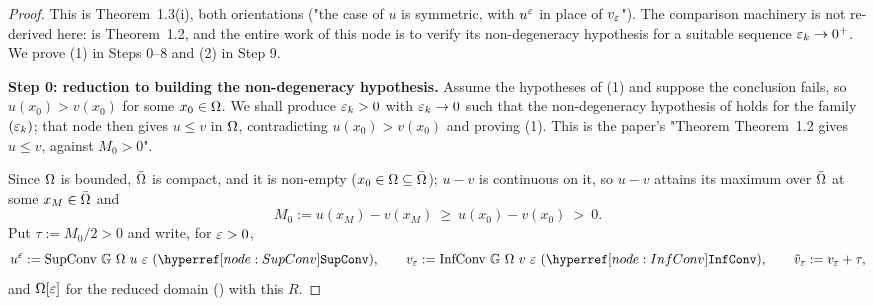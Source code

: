 \begin{proof}
This is Theorem~1.3(i), both orientations ("the case of $u$ is symmetric, with $u^{\varepsilon}$ in
place of $v_{\varepsilon}$"). The comparison machinery is not re-derived here:
 is Theorem~1.2, and the entire work of this node is to
verify its non-degeneracy hypothesis for a suitable sequence $\varepsilon_k\to0^{+}$. We prove (1)
in Steps 0--8 and (2) in Step 9.

\medskip\noindent\textbf{Step 0: reduction to building the non-degeneracy hypothesis.}
Assume the hypotheses of (1) and suppose the conclusion fails, so $u(x_0)>v(x_0)$ for some
$x_0\in\Omega$. We shall produce $\varepsilon_k>0$ with $\varepsilon_k\to0$ such that the non-degeneracy
hypothesis of  holds for the family $(\varepsilon_k)$; that
node then gives $u\le v$ in $\Omega$, contradicting $u(x_0)>v(x_0)$ and proving (1). This is the
paper's "Theorem Theorem~1.2 gives $u\le v$, against $M_0>0$".

Since $\Omega$ is bounded, $\bar{\Omega}$ is compact, and it is non-empty
($x_0\in\Omega\subseteq\bar{\Omega}$); $u-v$ is continuous on it, so $u-v$ attains its maximum over
$\bar{\Omega}$ at some $x_M\in\bar{\Omega}$ and
\[
 M_0:=u(x_M)-v(x_M)\ \ge\ u(x_0)-v(x_0)\ >\ 0 .
\]
Put $\tau:=M_0/2>0$ and write, for $\varepsilon>0$,
\[
 u^{\eps}:=\mathrm{SupConv}\ \mathbb G\ \Om\ u\ \eps\ (\noderef{SupConv}),\qquad
 v_{\eps}:=\mathrm{InfConv}\ \mathbb G\ \Om\ v\ \eps\ (\noderef{InfConv}),\qquad
 \tilde v_{\eps}:=v_{\eps}+\tau ,
\]
and $\Omega[\varepsilon]$ for the reduced domain () with this $R$.


\end{proof}
